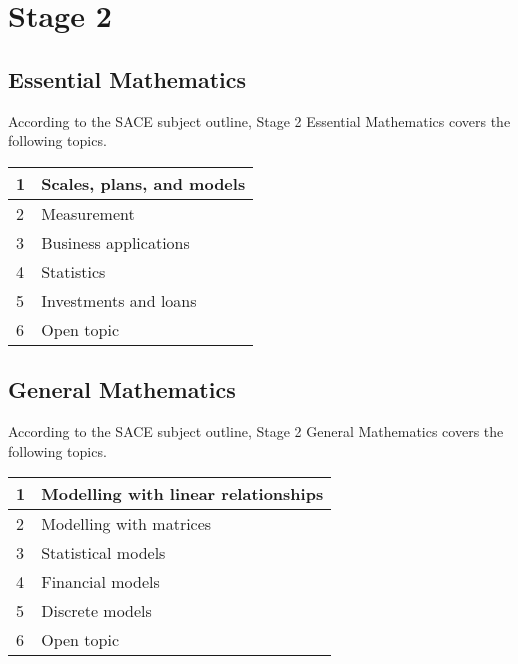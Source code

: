 \documentclass[11pt]{report}
\begin{document}
\section{Stage 2}
\subsection{Essential Mathematics}

    According to the SACE subject outline, Stage 2 Essential Mathematics covers the following topics.
    \begin{table}[H]
        \centering
        \begin{tabular}{|l|l|}
        \hline
            1 & Scales, plans, and models \\ \hline
            2 & Measurement \\ \hline
            3 & Business applications \\ \hline
            4 & Statistics \\ \hline
            5 & Investments and loans \\ \hline
            6 & Open topic \\ \hline
        \end{tabular}
    \end{table}

\subsection{General Mathematics}

    According to the SACE subject outline, Stage 2 General Mathematics covers the following topics.
    \begin{table}[H]
        \centering
        \begin{tabular}{|l|l|}
        \hline
            1 & Modelling with linear relationships \\ \hline
            2 & Modelling with matrices \\ \hline
            3 & Statistical models \\ \hline
            4 & Financial models \\ \hline
            5 & Discrete models \\ \hline
            6 & Open topic \\ \hline
        \end{tabular}
    \end{table}
\end{document}
